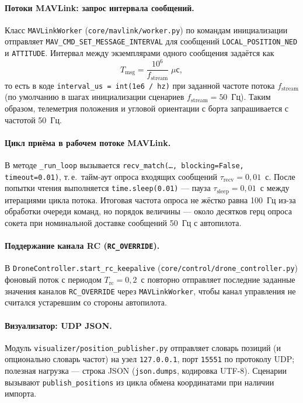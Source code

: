 \documentclass[12pt,a4paper]{article}
\begin{document}
\paragraph{Потоки MAVLink: запрос интервала сообщений.}
Класс \texttt{MAVLinkWorker} (\texttt{core/mavlink/worker.py}) по командам инициализации отправляет \texttt{MAV\_CMD\_SET\_MESSAGE\_INTERVAL} для сообщений \texttt{LOCAL\_POSITION\_NED} и \texttt{ATTITUDE}. Интервал между экземплярами одного сообщения задаётся как
\begin{equation}
  T_{\mathrm{msg}} = \frac{10^6}{f_{\mathrm{stream}}} \;\mu\text{с},
\end{equation}
то есть в коде \texttt{interval\_us = int(1e6 / hz)} при заданной частоте потока $f_{\mathrm{stream}}$ (по умолчанию в шагах инициализации сценариев $f_{\mathrm{stream}} = 50$~Гц). Таким образом, телеметрия положения и угловой ориентации с борта запрашивается с частотой 50~Гц.

\paragraph{Цикл приёма в рабочем потоке MAVLink.}
В методе \texttt{\_run\_loop} вызывается \texttt{recv\_match(\ldots, blocking=False, timeout=0.01)}, т.\,е.\ тайм-аут опроса входящих сообщений $\tau_{\mathrm{recv}} = 0{,}01$~с. После попытки чтения выполняется \texttt{time.sleep(0.01)} --- пауза $\tau_{\mathrm{sleep}} = 0{,}01$~с между итерациями цикла потока. Итоговая частота опроса не жёстко равна 100~Гц из-за обработки очереди команд, но порядок величины --- около десятков герц опроса сокета при номинальной доставке сообщений 50~Гц с автопилота.

\paragraph{Поддержание канала RC (\texttt{RC\_OVERRIDE}).}
В \texttt{DroneController.start\_rc\_keepalive} (\texttt{core/control/drone\_controller.py}) фоновый поток с периодом $T_{\mathrm{rc}} = 0{,}2$~с повторно отправляет последние заданные значения каналов \texttt{RC\_OVERRIDE} через \texttt{MAVLinkWorker}, чтобы канал управления не считался устаревшим со стороны автопилота.

\paragraph{Визуализатор: UDP JSON.}
Модуль \texttt{visualizer/position\_publisher.py} отправляет словарь позиций (и опционально словарь частот) на узел \texttt{127.0.0.1}, порт \texttt{15551} по протоколу UDP; полезная нагрузка --- строка JSON (\texttt{json.dumps}, кодировка UTF-8). Сценарии вызывают \texttt{publish\_positions} из цикла обмена координатами при наличии импорта.
\end{document}
